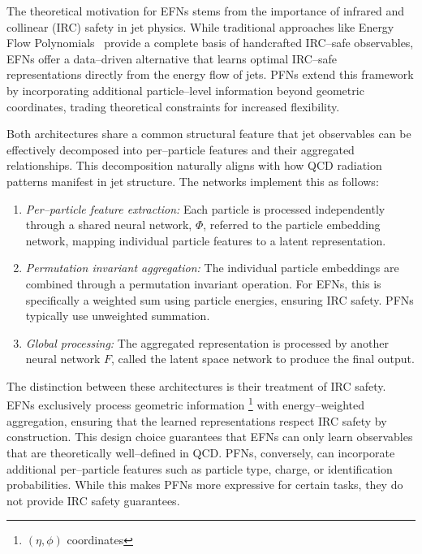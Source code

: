         The theoretical motivation for EFNs stems from the importance of infrared and collinear (IRC) safety in jet physics.
        While traditional approaches like Energy Flow Polynomials~\cite{Komiske2018EnergySubstructure} provide a complete basis of handcrafted IRC--safe observables, EFNs offer a data--driven alternative that learns optimal IRC--safe representations directly from the energy flow of jets.
        PFNs extend this framework by incorporating additional particle--level information beyond geometric coordinates, trading theoretical constraints for increased flexibility.
        
        Both architectures share a common structural feature that jet observables can be effectively decomposed into per--particle features and their aggregated relationships.
        This decomposition naturally aligns with how QCD radiation patterns manifest in jet structure.
        The networks implement this as follows:
        \begin{enumerate}
            \item \emph{Per--particle feature extraction:}
                Each particle is processed independently through a shared neural network, \(\Phi\), referred to the particle embedding network, mapping individual particle features to a latent representation.
            \item \emph{Permutation invariant aggregation:}
                The individual particle embeddings are combined through a permutation invariant operation.
                For EFNs, this is specifically a weighted sum using particle energies, ensuring IRC safety.
                PFNs typically use unweighted summation.
            \item \emph{Global processing:}
                The aggregated representation is processed by another neural network \(F\), called the latent space network to produce the final output.
        \end{enumerate}
        The distinction between these architectures is their treatment of IRC safety.
        EFNs exclusively process geometric information \footnote{\((\eta,\phi)\) coordinates} with energy--weighted aggregation, ensuring that the learned representations respect IRC safety by construction.
        This design choice guarantees that EFNs can only learn observables that are theoretically well--defined in QCD.
        PFNs, conversely, can incorporate additional per--particle features such as particle type, charge, or identification probabilities.
        While this makes PFNs more expressive for certain tasks, they do not provide IRC safety guarantees.
        
